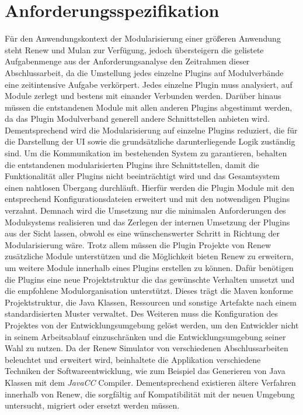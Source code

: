 \section{Anforderungsspezifikation} 
	Für den Anwendungskontext der Modularisierung einer größeren Anwendung steht Renew und Mulan zur Verfügung, jedoch übersteigern die gelistete Aufgabenmenge  aus der Anforderungsanalyse den Zeitrahmen dieser Abschlussarbeit, da die Umstellung jedes einzelne Plugins auf Modulverbände eine zeitintensive Aufgabe verkörpert. Jedes einzelne Plugin muss analysiert, auf Module zerlegt und bestens mit einander Verbunden werden. Darüber hinaus müssen die entstandenen Module mit allen anderen Plugins abgestimmt werden, da das Plugin Modulverband generell andere Schnittstellen anbieten wird. Dementsprechend wird die Modularisierung auf einzelne Plugins reduziert, die für die Darstellung der UI sowie die grundsätzliche darunterliegende Logik zuständig sind. Um die Kommunikation im bestehenden System zu garantieren, behalten die entstandenen modularisierten Plugins ihre Schnittstellen, damit die Funktionalität aller Plugins nicht beeinträchtigt wird und das Gesamtsystem einen nahtlosen Übergang durchläuft. Hierfür werden die Plugin Module mit den entsprechend Konfigurationsdateien erweitert und mit den notwendigen Plugins verzahnt. Demnach wird die Umsetzung nur die minimalen Anforderungen des Modulsystems realisieren und das Zerlegen der internen Umsetzung der Plugins aus der Sicht lassen, obwohl es eine wünschenswerter Schritt in Richtung der Modularisierung wäre. \newline 
	Trotz allem müssen die Plugin Projekte von Renew zusätzliche Module unterstützen und die Möglichkeit bieten Renew zu erweitern, um weitere Module innerhalb eines Plugins erstellen zu können. Dafür benötigen die Plugins eine neue Projektstruktur die das gewünschte Verhalten umsetzt und die empfohlene Modulorganisation unterstützt. Dieses trägt die Maven konforme Projektstruktur, die Java Klassen, Ressourcen und sonstige Artefakte nach einem standardisierten Muster verwaltet. Des Weiteren muss die Konfiguration des Projektes von der Entwicklungsumgebung gelöst werden, um den Entwickler nicht in seinem Arbeitsablauf einzuschränken und die Entwicklungsumgebung seiner Wahl zu nutzen. \newline
	Da der Renew Simulator von verschiedenen Abschlussarbeiten beleuchtet und erweitert wird, beinhaltete die Applikation verschiedene Techniken der Softwareentwicklung, wie zum Beispiel das Generieren von Java Klassen mit dem \textit{JavaCC} Compiler. Dementsprechend existieren ältere Verfahren innerhalb von Renew, die sorgfältig auf Kompatibilität mit der neuen Umgebung untersucht, migriert oder ersetzt werden müssen. \bigbreak

